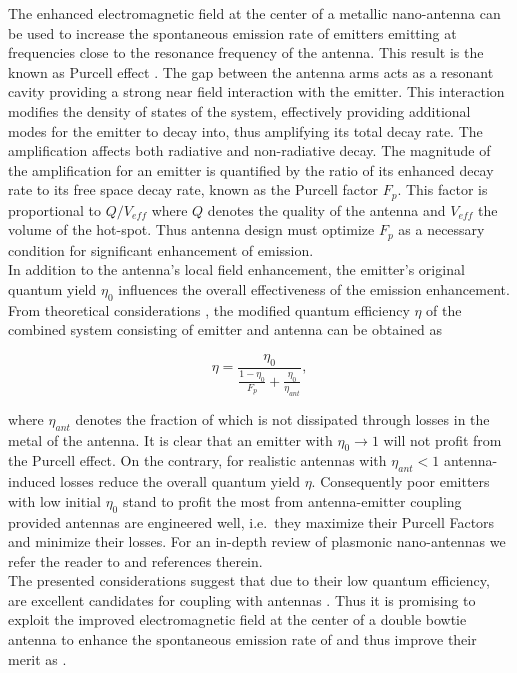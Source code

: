 		The enhanced electromagnetic field at the center of a metallic nano-antenna can be used to increase the spontaneous emission rate of emitters emitting at frequencies close to the resonance frequency of the antenna. This result is the known as Purcell effect \cite{purcell1995spontaneous}. The gap between the antenna arms acts as a resonant cavity providing a strong near field interaction with the emitter. This interaction modifies the density of states of the system, effectively providing additional modes for the emitter to decay into, thus amplifying its total decay rate. The amplification affects both radiative and non-radiative decay.
		The magnitude of the amplification for an emitter is quantified by the ratio of its enhanced decay rate to its free space decay rate, known as the Purcell factor $F_p$. This factor is proportional to $Q/V_{eff}$ where $Q$ denotes the quality of the antenna and $V_{eff}$ the volume of the hot-spot. Thus antenna design must optimize $F_p$ as a necessary condition for significant enhancement of \fl emission.
		\\
		In addition to the antenna's local field enhancement, the emitter's original quantum yield $\eta_0$ influences the overall effectiveness of the emission enhancement. From theoretical considerations \cite{rahbany2016towards, mohammadi2008gold, mohammadi2010fluorescence, wientjes2014nanoantenna}, the modified quantum efficiency $\eta$ of the combined system consisting of emitter and antenna can be obtained as

		\begin{equation}
			\eta = \frac{\eta_0}{\frac{1-\eta_0}{F_p} + \frac{\eta_0}{\eta_{ant}} },
		\end{equation}

		where $\eta_{ant}$ denotes the fraction of \fl which is not dissipated through losses in the metal of the antenna. It is clear that an emitter with $\eta_0 \to 1$ will not profit from the Purcell effect. On the contrary, for realistic antennas with $\eta_{ant} < 1$ antenna-induced losses reduce the overall quantum yield $\eta$. Consequently poor emitters with low initial $\eta_{0}$ stand to profit the most from antenna-emitter coupling provided antennas are engineered well, i.e.\ they maximize their Purcell Factors and minimize their losses. For an in-depth review of plasmonic nano-antennas we refer the reader to \cite{rahbany2016towards} and references therein.
		\\
		The presented considerations suggest that due to their low quantum efficiency, \sivs are excellent candidates for coupling with antennas \cite{Neu2012a}. Thus it is promising to exploit the improved electromagnetic field at the center of a double bowtie antenna to enhance the spontaneous emission rate of \sivs and thus improve their merit as \spss.

